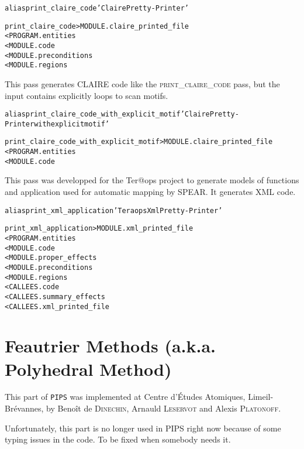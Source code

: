 \documentclass[a4paper]{report}
\newenvironment{PipsMake}{\begin{alltt}}{\end{alltt}}
\newenvironment{PipsPass}[1]{\label{pass:#1}}{}
\newcommand{\Pips}{\texttt{PIPS}}
\begin{document}
\begin{PipsMake}
alias print_claire_code 'Claire Pretty-Printer'

print_claire_code        > MODULE.claire_printed_file
        < PROGRAM.entities
        < MODULE.code
        < MODULE.preconditions
        < MODULE.regions
\end{PipsMake}


\begin{PipsPass}{print_claire_code_with_explicit_motif}
This pass generates CLAIRE code like the \textsc{print\_claire\_code}
pass, but the input contains explicitly loops to scan motifs.
\end{PipsPass}

\begin{PipsMake}
alias print_claire_code_with_explicit_motif 'Claire Pretty-Printer with explicit motif'

print_claire_code_with_explicit_motif       > MODULE.claire_printed_file
        < PROGRAM.entities
        < MODULE.code
\end{PipsMake}


\begin{PipsPass}{print_xml_application}
This pass was developped for the Ter@ops project to generate models
of functions and application used for automatic mapping by SPEAR.
It generates XML code.
\end{PipsPass}

\begin{PipsMake}
alias print_xml_application 'Teraops Xml Pretty-Printer'

print_xml_application      > MODULE.xml_printed_file
    < PROGRAM.entities
    < MODULE.code
    < MODULE.proper_effects
    < MODULE.preconditions
    < MODULE.regions
    < CALLEES.code
    < CALLEES.summary_effects
    < CALLEES.xml_printed_file
\end{PipsMake}

\chapter{Feautrier Methods (a.k.a. Polyhedral Method)}
\label{section-feautrier-methods}

This part of \Pips{} was implemented at Centre d'\'Etudes Atomiques,
Limeil-Br\'evannes, by Beno\^it de \textsc{Dinechin}, Arnauld
\textsc{Leservot} and Alexis \textsc{Platonoff}.

Unfortunately, this part is no longer used in PIPS right now because of
some typing issues in the code. To be fixed when somebody needs it.
\end{document}
